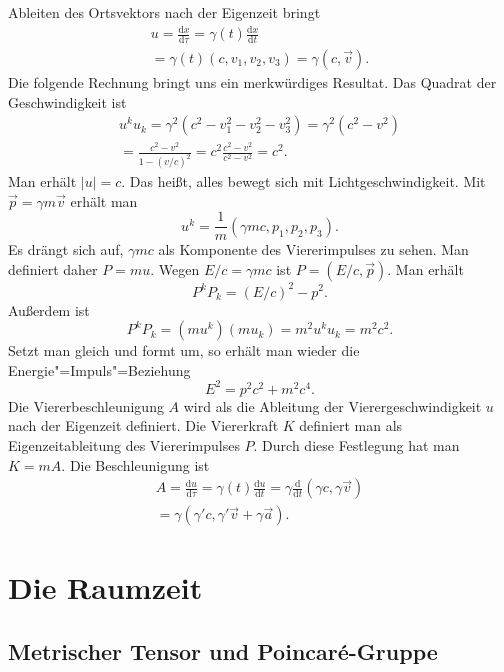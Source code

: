 \documentclass[a4paper,11pt,fleqn,twocolumn,twoside]{scrartcl}
\begin{document}
Ableiten des Ortsvektors nach der Eigenzeit bringt%
\begin{gather*}
u = \frac{\mathrm dx}{\mathrm d\tau}
= \gamma(t)\frac{\mathrm dx}{\mathrm dt}\\
= \gamma(t)(c,v_1,v_2,v_3) = \gamma(c,\vec v).
\end{gather*}
Die folgende Rechnung bringt uns ein merkwürdiges Resultat.
Das Quadrat der Geschwindigkeit ist%
\begin{gather*}
u^k u_k = \gamma^2 (c^2-v_1^2-v_2^2-v_3^2)
= \gamma^2 (c^2-v^2)\\
= \frac{c^2-v^2}{1-(v/c)^2}
= c^2 \frac{c^2-v^2}{c^2-v^2}
= c^2.
\end{gather*}
Man erhält $|u|=c$. Das heißt, alles bewegt sich mit
Lichtgeschwindigkeit. Mit $\vec p=\gamma m\vec v$
erhält man%
\[u^k = \frac{1}{m} (\gamma mc,p_1,p_2,p_3).\]
Es drängt sich auf, $\gamma mc$ als Komponente des Viererimpulses
zu sehen. Man definiert daher $P = mu.$
Wegen $E/c=\gamma mc$ ist $P=(E/c,\vec p)$. Man erhält%
\[P^k P_k = (E/c)^2-p^2.\]
Außerdem ist
\[P^k P_k = (mu^k)(mu_k) = m^2 u^k u_k = m^2 c^2.\]
Setzt man gleich und formt um, so erhält man wieder die
Energie"=Impuls"=Beziehung%
\[E^2 = p^2c^2 + m^2c^4.\]
Die Viererbeschleunigung $A$ wird als die Ableitung der
Vierergeschwindigkeit $u$ nach der Eigenzeit definiert.
Die Viererkraft $K$ definiert man als Eigenzeitableitung des
Viererimpulses $P$. Durch diese Festlegung hat man $K=mA$.
Die Beschleunigung ist%
\begin{gather*}
A = \frac{\mathrm du}{\mathrm d\tau}
= \gamma(t)\frac{\mathrm du}{\mathrm dt}
= \gamma\frac{\mathrm d}{\mathrm dt}(\gamma c,\gamma\vec v)\\
= \gamma (\gamma' c,\gamma'\vec v+\gamma\vec a).
\end{gather*}

\section{Die Raumzeit}
\subsection{\texorpdfstring{Metrischer Tensor und\newline
Poincaré-Gruppe}{Metrischer Tensor und Poincare-Gruppe}}
\end{document}
